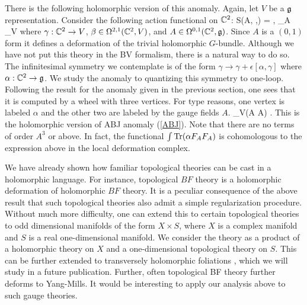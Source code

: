 \documentclass[11pt]{amsart}
\begin{document}
There is the following holomorphic version of this anomaly. 
Again, let $V$ be a $\mathfrak g$ representation.
Consider the following action functional on $\mathbb C^2$:
\ben
S(A, \beta,\gamma) = \int \<\beta, \dbar_A \gamma\>_V
\een
where $\gamma : \mathbb C^2 \to V$, $\beta \in \Omega^{2,1}(\mathbb C^2 , V)$, and $A \in \Omega^{0,1}(\mathbb C^2, \mathfrak g)$. 
Since $A$ is a $(0,1)$ form it defines a deformation of the trivial holomorphic $G$-bundle. 
Although we have not put this theory in the BV formalism, there is a natural way to do so. 
The infinitesimal symmetry we contemplate is of the form $\gamma \to \gamma + \epsilon [\alpha, \gamma]$ where $\alpha : \mathbb C^2 \to \mathfrak g$. 
We study the anomaly to quantizing this symmetry to one-loop.
Following the result for the anomaly given in the previous section, one sees that it is computed by a wheel with three vertices. 
For type reasons, one vertex is labeled $\alpha$ and the other two are labeled by the gauge fields $A$.
\ben
{}_V(\alpha \partial A \partial A) .
\een
This is the holomorphic version of ABJ anomaly (\ref{ABJ}). 
Note that there are no terms of order $A^3$ or above. 
In fact, the functional $\int {\rm Tr}(\alpha F_A F_A)$ is cohomologous to the expression above in the local deformation complex.


\begin{rmk} 
We have already shown how familiar topological theories can be cast in a holomorphic language.
For instance, topological $BF$ theory is a holomorphic deformation of holomorphic $BF$ theory. 
It is a peculiar consequence of the above result that such topological theories also admit a simple regularization procedure. 
Without much more difficulty, one can extend this to certain topological theories to odd dimensional manifolds of the form $X \times S$, where $X$ is a complex manifold and $S$ is a real one-dimensional manifold. 
We consider the theory as a product of a holomorphic theory on $X$ and a one-dimensional topological theory on $S$. 
This can be further extended to transversely holomorphic foliations \cite{THF1,THF2}, which we will study in a future publication.
Further, often topological BF theory further deforms to Yang-Mills.
It would be interesting to apply our analysis above to such gauge theories. 
\end{rmk}
\end{document}
